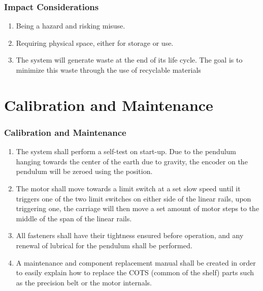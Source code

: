 \documentclass[aspectratio=169]{beamer}
\begin{document}
\begin{frame}
    \frametitle{Impact Considerations}

    \begin{enumerate}
        \item Being a hazard and risking misuse.
        \item Requiring physical space, either for storage or use.
        \item The system will generate waste at the end of its life cycle. The goal is to minimize this waste through the use of recyclable materials
    \end{enumerate}

\end{frame}

\section{Calibration and Maintenance}
\begin{frame}
    \frametitle{Calibration and Maintenance}

    \begin{enumerate}
        \item The system shall perform a self-test on start-up. Due to the pendulum hanging towards the center of the earth due to gravity, the encoder on the pendulum will be zeroed using the position.
        \item The motor shall move towards a limit switch at a set slow speed until it triggers one of the two limit switches on either side of the linear rails, upon triggering one, the carriage will then move a set amount of motor steps to the middle of the span of the linear rails.
        \item All fasteners shall have their tightness ensured before operation, and any renewal of lubrical for the pendulum shall be performed.
        \item A maintenance and component replacement manual shall be created in order to easily explain how to replace the COTS (common of the shelf) parts such as the precision belt or the motor internals.
    \end{enumerate}

\end{frame}
\end{document}
